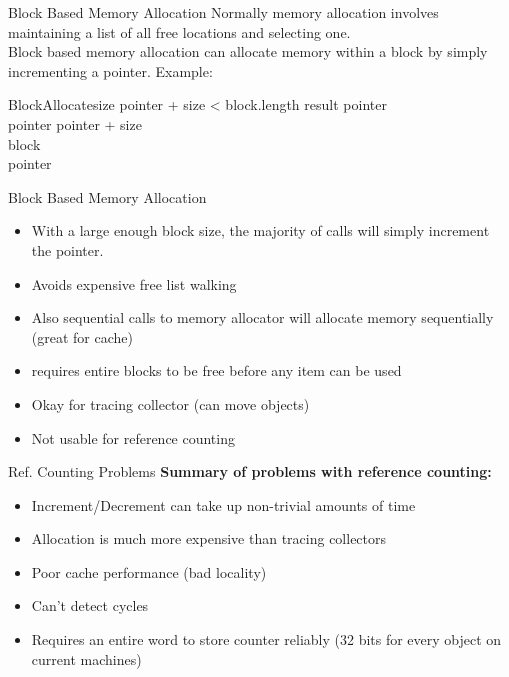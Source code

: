 \documentclass{beamer}
\begin{document}
\begin{frame}{Block Based Memory Allocation}
	Normally memory allocation involves maintaining a list of all free locations and selecting one.\\
	
	Block based memory allocation can allocate memory within a block by simply incrementing a pointer. Example:\\
	\begin{pseudocode}{BlockAllocate}{size}
		\IF pointer + size < block.length \THEN 
			\BEGIN
				result \GETS pointer\\
				pointer \GETS pointer + size\\
			\END
		\ELSE
			\BEGIN
				block \GETS {}\\
				pointer \\
			\END
	\end{pseudocode}
\end{frame}

\begin{frame}{Block Based Memory Allocation}
	\begin{itemize}
		\item With a large enough block size, the majority of calls will simply increment the pointer.
		\item Avoids expensive free list walking
		\item Also sequential calls to memory allocator will allocate memory sequentially (great for cache)
		\pause
		\item requires entire blocks to be free before any item can be used
		\pause
		\item Okay for tracing collector (can move objects)
		\pause
		\item Not usable for reference counting
	\end{itemize}
\end{frame}

\begin{frame}{Ref. Counting Problems}
	\textbf{Summary of problems with reference counting:}
	\begin{itemize}
		\item Increment/Decrement can take up non-trivial amounts of time
		\item Allocation is much more expensive than tracing collectors
		\item Poor cache performance (bad locality)
		\item Can't detect cycles
		\item Requires an entire word to store counter reliably (32 bits for every object on current machines)
	\end{itemize}
\end{frame}
\end{document}
